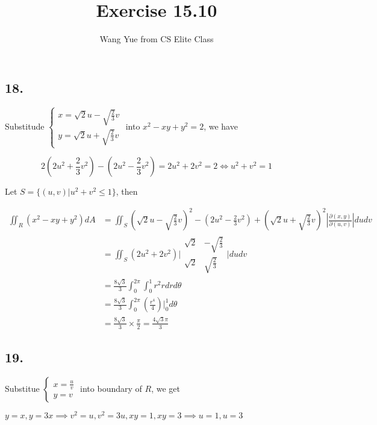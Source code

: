 \documentclass{article}
\begin{document}
  \title{Exercise 15.10}
  \author{Wang Yue from CS Elite Class}
  \maketitle

  \subsection*{18. }

  Substitude $\left\{ \begin{array}{ll} x = \sqrt 2 u - \sqrt{\frac 2 3} v \\ y = \sqrt{2} u + \sqrt{\frac 2 3} v \end{array}\right.$ into $x^2 - xy + y^2 = 2$, we have

  $$2(2u^2 + \frac 2 3 v^2) - (2u^2 - \frac 2 3 v^2) = 2u^2 + 2v^2 = 2 \iff u^2 + v^2 = 1$$

  Let $S = \{ (u, v) | u^2 + v^2 \leq 1 \}$, then

  $$\begin{aligned}
    \iint_R (x^2-xy+y^2) dA &= \iint_S (\sqrt 2 u - \sqrt{\frac 2 3} v)^2 - (2u^2 - \frac 2 3 v^2) + (\sqrt 2 u + \sqrt{\frac 2 3} v)^2 |\frac{\partial (x, y)}{\partial (u, v)}| du dv \\
    &= \iint_S (2u^2 + 2v^2) \biggl|\begin{matrix}
      \sqrt 2 & -\sqrt{\frac 2 3} \\
      \sqrt 2 & \sqrt{\frac 2 3}
    \end{matrix}\biggl| du dv \\
    &= \frac{8\sqrt 3}{3} \int_0^{2\pi} \int_0^1 r^2 r dr d\theta \\
    &= \frac{8\sqrt 3}{3} \int_0^{2\pi} (\frac{r^4}{4})\biggl|_0^1 d\theta \\
    &= \frac{8\sqrt 3}{3} \times \frac{\pi}{2} = \frac{4\sqrt 3 \pi}{3}
  \end{aligned}$$

  \subsection*{19. }

  Substitue $\left\{ \begin{array}{ll} x = \frac u v \\ y = v \end{array}\right.$ into boundary of $R$, we get

  $y = x, y = 3x \implies v^2 = u, v^2 = 3u, xy = 1, xy = 3 \implies u = 1, u = 3$
\end{document}
